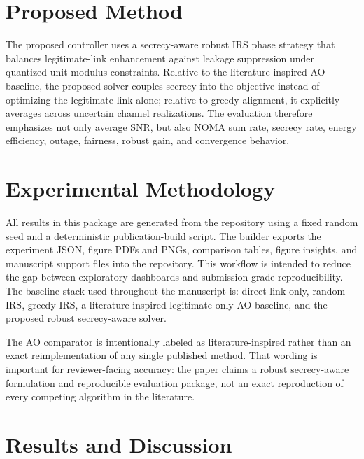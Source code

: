 \documentclass[journal]{IEEEtran}
\begin{document}




\section{Proposed Method}
The proposed controller uses a secrecy-aware robust IRS phase strategy that balances legitimate-link enhancement against leakage suppression under quantized unit-modulus constraints. Relative to the literature-inspired AO baseline, the proposed solver couples secrecy into the objective instead of optimizing the legitimate link alone; relative to greedy alignment, it explicitly averages across uncertain channel realizations. The evaluation therefore emphasizes not only average SNR, but also NOMA sum rate, secrecy rate, energy efficiency, outage, fairness, robust gain, and convergence behavior.







\section{Experimental Methodology}
All results in this package are generated from the repository using a fixed random seed and a deterministic publication-build script. The builder exports the experiment JSON, figure PDFs and PNGs, comparison tables, figure insights, and manuscript support files into the repository. This workflow is intended to reduce the gap between exploratory dashboards and submission-grade reproducibility. The baseline stack used throughout the manuscript is: direct link only, random IRS, greedy IRS, a literature-inspired legitimate-only AO baseline, and the proposed robust secrecy-aware solver.

The AO comparator is intentionally labeled as literature-inspired rather than an exact reimplementation of any single published method. That wording is important for reviewer-facing accuracy: the paper claims a robust secrecy-aware formulation and reproducible evaluation package, not an exact reproduction of every competing algorithm in the literature.

\section{Results and Discussion}

\end{document}
